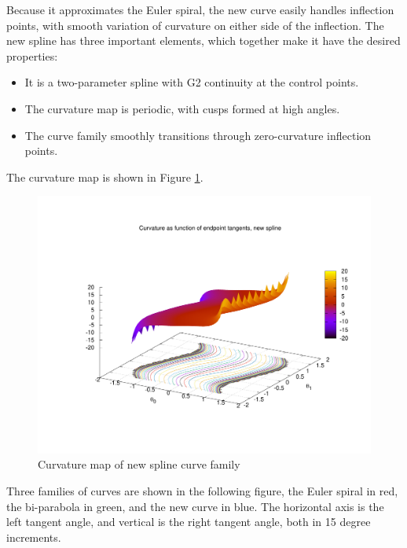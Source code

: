 \documentclass{article}
\begin{document}
Because it approximates the Euler spiral, the new curve easily handles inflection points, with smooth variation of curvature on either side of the inflection. The new spline has three important elements, which together make it have the desired properties:

\begin{itemize}

\item It is a two-parameter spline with G2 continuity at the control points.

\item The curvature map is periodic, with cusps formed at high angles.

\item The curve family smoothly transitions through zero-curvature inflection points.

\end{itemize}

The curvature map is shown in Figure \ref{newcurve_kmap}.

\begin{figure}
\centering
\includegraphics[scale=0.5]{newcurve_kmap}
\caption{Curvature map of new spline curve family}
\label{newcurve_kmap}
\end{figure}

Three families of curves are shown in the following figure, the Euler spiral in red, the bi-parabola in green, and the new curve in blue. The horizontal axis is the left tangent angle, and vertical is the right tangent angle, both in 15 degree increments.
\end{document}
